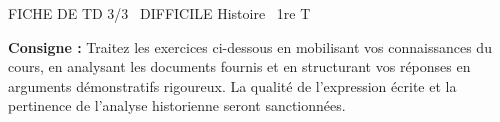 \documentclass[11pt]{article}
\begin{document}
\begin{tcolorbox}[enhanced,colback=popink,colframe=popink,arc=10pt,boxrule=0pt,left=12pt,right=12pt,top=9pt,bottom=9pt]
{\color{white}\popxbold\small FICHE DE TD 3/3 \textbullet\ DIFFICILE \hfill Histoire \textbullet\ 1re T\par}
\end{tcolorbox}
\vspace{4pt}
\noindent\textbf{Consigne :} Traitez les exercices ci-dessous en mobilisant vos connaissances du cours, en analysant les documents fournis et en structurant vos réponses en arguments démonstratifs rigoureux. La qualité de l'expression écrite et la pertinence de l'analyse historienne seront sanctionnées.
\end{document}
